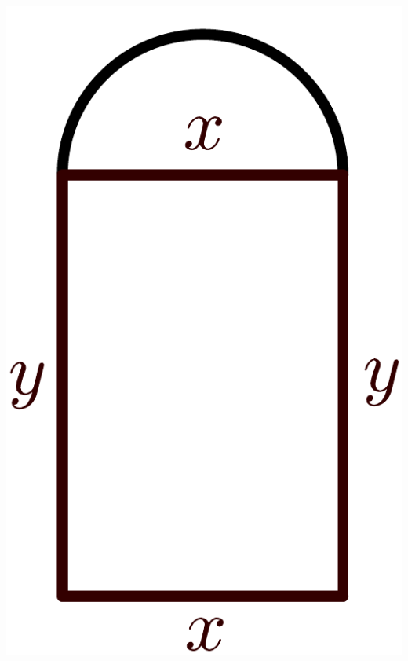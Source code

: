 \begin{minipage}{0.15\textwidth}
	\includegraphics[width=\textwidth]{images/window}
\end{minipage}\\
